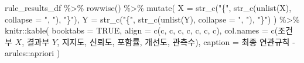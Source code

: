 \documentclass[
]{book}
\newenvironment{Shaded}{\begin{snugshade}}{\end{snugshade}}
\newcommand{\AttributeTok}[1]{\textcolor[rgb]{0.77,0.63,0.00}{#1}}
\newcommand{\ConstantTok}[1]{\textcolor[rgb]{0.00,0.00,0.00}{#1}}
\newcommand{\FunctionTok}[1]{\textcolor[rgb]{0.00,0.00,0.00}{#1}}
\newcommand{\NormalTok}[1]{#1}
\newcommand{\SpecialCharTok}[1]{\textcolor[rgb]{0.00,0.00,0.00}{#1}}
\newcommand{\StringTok}[1]{\textcolor[rgb]{0.31,0.60,0.02}{#1}}
\begin{document}
\begin{Shaded}
\begin{Highlighting}[]
\NormalTok{rule\_results\_df }\SpecialCharTok{\%\textgreater{}\%}
  \FunctionTok{rowwise}\NormalTok{() }\SpecialCharTok{\%\textgreater{}\%}
  \FunctionTok{mutate}\NormalTok{(}
    \AttributeTok{X =} \FunctionTok{str\_c}\NormalTok{(}\StringTok{"\{"}\NormalTok{, }\FunctionTok{str\_c}\NormalTok{(}\FunctionTok{unlist}\NormalTok{(X), }\AttributeTok{collapse =} \StringTok{", "}\NormalTok{), }\StringTok{"\}"}\NormalTok{),}
    \AttributeTok{Y =} \FunctionTok{str\_c}\NormalTok{(}\StringTok{"\{"}\NormalTok{, }\FunctionTok{str\_c}\NormalTok{(}\FunctionTok{unlist}\NormalTok{(Y), }\AttributeTok{collapse =} \StringTok{", "}\NormalTok{), }\StringTok{"\}"}\NormalTok{)}
\NormalTok{  ) }\SpecialCharTok{\%\textgreater{}\%}
\NormalTok{  knitr}\SpecialCharTok{::}\FunctionTok{kable}\NormalTok{(}
    \AttributeTok{booktabs =} \ConstantTok{TRUE}\NormalTok{,}
    \AttributeTok{align =} \FunctionTok{c}\NormalTok{(}\StringTok{\textquotesingle{}c\textquotesingle{}}\NormalTok{, }\StringTok{\textquotesingle{}c\textquotesingle{}}\NormalTok{, }\StringTok{\textquotesingle{}c\textquotesingle{}}\NormalTok{, }\StringTok{\textquotesingle{}c\textquotesingle{}}\NormalTok{, }\StringTok{\textquotesingle{}c\textquotesingle{}}\NormalTok{, }\StringTok{\textquotesingle{}c\textquotesingle{}}\NormalTok{, }\StringTok{\textquotesingle{}c\textquotesingle{}}\NormalTok{),}
    \AttributeTok{col.names =} \FunctionTok{c}\NormalTok{(}\StringTok{\textquotesingle{}조건부 $X$\textquotesingle{}}\NormalTok{, }\StringTok{\textquotesingle{}결과부 $Y$\textquotesingle{}}\NormalTok{, }\StringTok{\textquotesingle{}지지도\textquotesingle{}}\NormalTok{,}
                  \StringTok{\textquotesingle{}신뢰도\textquotesingle{}}\NormalTok{, }\StringTok{\textquotesingle{}포함률\textquotesingle{}}\NormalTok{, }\StringTok{\textquotesingle{}개선도\textquotesingle{}}\NormalTok{, }\StringTok{\textquotesingle{}관측수\textquotesingle{}}\NormalTok{),}
    \AttributeTok{caption =} \StringTok{\textquotesingle{}최종 연관규칙 {-} arules::apriori\textquotesingle{}}
\NormalTok{  )}
\end{Highlighting}
\end{Shaded}
\end{document}
